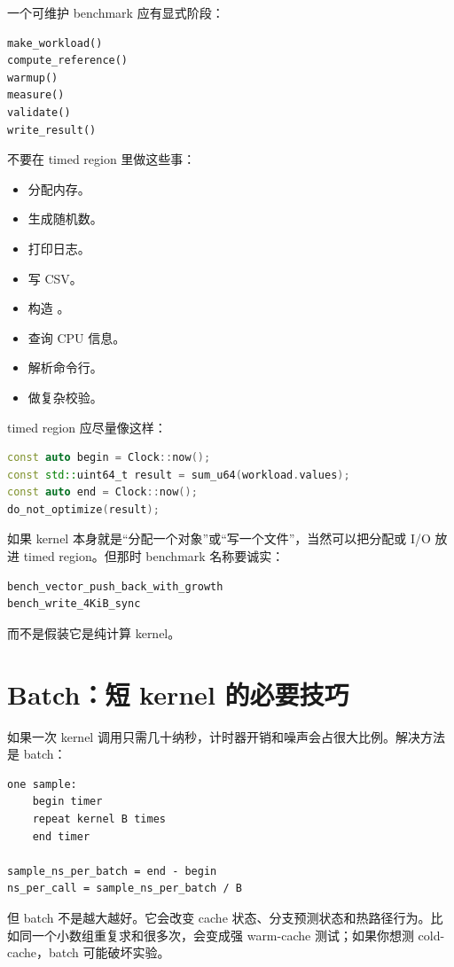 一个可维护 benchmark 应有显式阶段：

\begin{lstlisting}
make_workload()
compute_reference()
warmup()
measure()
validate()
write_result()
\end{lstlisting}

不要在 timed region 里做这些事：

\begin{itemize}
  \item 分配内存。
  \item 生成随机数。
  \item 打印日志。
  \item 写 CSV。
  \item 构造 。
  \item 查询 CPU 信息。
  \item 解析命令行。
  \item 做复杂校验。
\end{itemize}

timed region 应尽量像这样：

\begin{lstlisting}[language=C++]
const auto begin = Clock::now();
const std::uint64_t result = sum_u64(workload.values);
const auto end = Clock::now();
do_not_optimize(result);
\end{lstlisting}

如果 kernel 本身就是“分配一个对象”或“写一个文件”，当然可以把分配或 I/O 放进 timed region。但那时 benchmark 名称要诚实：

\begin{lstlisting}
bench_vector_push_back_with_growth
bench_write_4KiB_sync
\end{lstlisting}

而不是假装它是纯计算 kernel。

\section{Batch：短 kernel 的必要技巧}

如果一次 kernel 调用只需几十纳秒，计时器开销和噪声会占很大比例。解决方法是 batch：

\begin{lstlisting}
one sample:
    begin timer
    repeat kernel B times
    end timer

sample_ns_per_batch = end - begin
ns_per_call = sample_ns_per_batch / B
\end{lstlisting}

但 batch 不是越大越好。它会改变 cache 状态、分支预测状态和热路径行为。比如同一个小数组重复求和很多次，会变成强 warm-cache 测试；如果你想测 cold-cache，batch 可能破坏实验。

